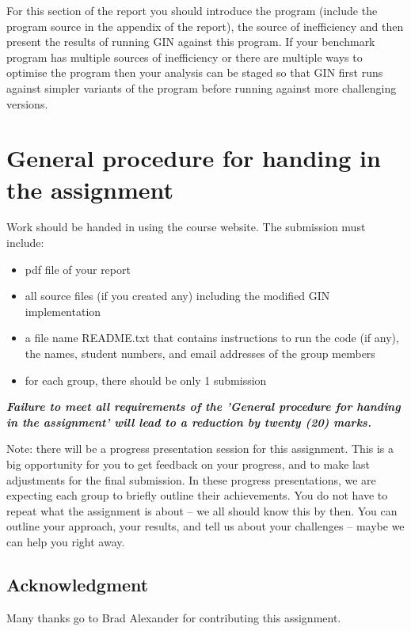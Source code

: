 \documentclass{pracs}
\begin{document}
For this section of the report you should introduce the program (include the program source in the appendix of the report), the source of inefficiency and then present the results of running GIN against this program. If your benchmark program has multiple sources of inefficiency or there are multiple ways to optimise the program then your analysis can be staged so that GIN first runs against simpler variants of the program before running against more challenging versions. 





\section{General procedure for handing in the assignment}
Work should be handed in using the course website. The submission must include:
\begin{itemize}
\item pdf file of your report
\item all source files (if you created any) including the modified GIN implementation
\item a file name README.txt that contains instructions to run the code (if any), the names, student numbers, and email addresses of the group members
\item for each group, there should be only 1 submission
\end{itemize}

\textbf{\emph{Failure to meet all requirements of the 'General procedure for handing in the assignment' will lead to a reduction by twenty (20) marks.}}

Note: there will be a progress presentation session for this assignment. This is a big opportunity for you to get feedback on your progress, and to make last adjustments for the final submission. 
In these progress presentations, we are expecting each group to briefly outline their achievements. You do not have to repeat what the assignment is about -- we all should know this by then. You can outline your approach, your results, and tell us about your challenges -- maybe we can help you right away.


\subsection*{Acknowledgment}

Many thanks go to Brad Alexander for contributing this assignment.
\end{document}
